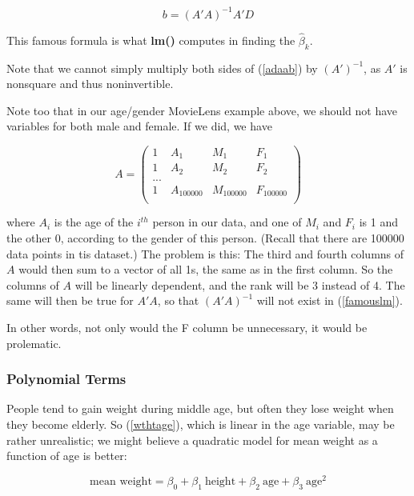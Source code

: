 \begin{equation}
\label{famouslm}
b = (A'A)^{-1} A'D
\end{equation}

This famous formula is what \textbf{lm()} computes in finding the
$\widehat{\beta}_k$.

Note that we cannot simply multiply both sides of (\ref{adaab}) by
$(A')^{-1}$, as $A'$ is nonsquare and thus noninvertible.

Note too that in our age/gender MovieLens example above, we should not
have variables for both male and female.  If we did, we have

\begin{equation}
A =
\left(
\begin{array}{rrrr}
1 & A_1 & M_1 & F_1 \\
1 & A_2 & M_2 & F_2 \\
... \\
1 & A_{100000} & M_{100000} & F_{100000} \\
\end{array}
\right )
\end{equation}

where $A_i$ is the age of the $i^{th}$ person in our data, and one of
$M_{i}$ and $F_{i}$ is 1 and the other 0, according to the
gender of this person.  (Recall that there are 100000 data points in tis
dataset.)  The problem is this:  The third and fourth columns of $A$
would then sum to a vector of all 1s, the same as in the first column.
So the columns of $A$ will be linearly dependent, and the rank will be 3
instead of 4.  The same will then be true for $A'A$, so that $(A'A)^{-1}$
will not exist in (\ref{famouslm}).

In other words, not only would the F column be unnecessary, it would be
prolematic.

\subsubsection{Polynomial Terms}
\label{poly}

People tend to gain weight during middle age, but often they lose weight
when they become elderly.  So (\ref{wthtage}), which is linear in the
age variable, may be rather unrealistic; we might believe a quadratic
model for mean weight as a function of age is better:

\begin{equation}
\label{wthtage2}
\textrm{mean weight} = \beta_0 + \beta_1 ~ \textrm{height} + 
\beta_2 ~ \textrm{age} +
\beta_3 ~ \textrm{age}^2
\end{equation}

